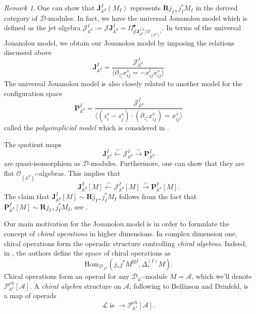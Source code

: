 \documentclass[11pt]{amsart}
\theoremstyle{definition}
\theoremstyle{remark}
\newtheorem{rem}[thm]{Remark}
\numberwithin{equation}{section}
\newcommand{\R}{\mathbf{R}}
\renewcommand{\AA}{\mathbb{A}}
\newcommand{\op}{\operatorname}
\newcommand{\cA}{\mathcal{A}}
\newcommand{\cP}{\mathcal{P}}
\begin{document}
\begin{rem}
One can show that $\mathbf{J}_{\mathbb{A}^d}^{{I}}(M_{{I}})$ represents $\R j_{I*}j^*_IM_{I}$ in the derived category
of $\mathcal{D}$-modules. In fact, we have the universal Jouanolou model \cite[4.1.3. (ii)]{BD} which
is defined as the jet algebra $\mathcal{J}_{\mathbb{A}^d}^{{I}}:=\mathscr{J}\mathbf{J}_{\mathbb{A}^d}^{{I}}
=\Omega^{\bullet}_{\mathscr{J}\mathbf{J}_{\mathbb{A}^d}^{{I},0}/\mathcal{O}_{(\mathbb{A}^d)^I}}$.
In terms of the universal Jouanolou model, we obtain our Jouanolou model by imposing the relations discussed above 
\[
\mathbf{J}_{\mathbb{A}^d}^{{I}}=\frac{\mathcal{J}_{\mathbb{A}^d}^{{I}}}{\langle \partial_{z^t_i}x^s_{ij}=-x^t_{ij}
x^s_{ij}\rangle}
\]
The universal Jouanolou model is also closely related to another model for the configuration space
\[
  \mathbf{P}_{\mathbb{A}^d}^{{I}}=\frac{\mathcal{J}_{\mathbb{A}^d}^{{I}}}{\langle (z^s_i-z^s_j)\cdot(\partial_{z^s_i}x^s_{ij})=x^s_{ij}\rangle}
  \]
  called the \textit{polysimplicial model} which is considered in \cite{FGY}.

The quotient maps
\[
\mathbf{J}_{\mathbb{A}^d}^{{I}}\xleftarrow{\sim}\mathcal{J}_{\mathbb{A}^d}^{{I}}\xrightarrow{\sim}\mathbf{P}_{\mathbb{A}^d}^{{I}}
\]
are quasi-isomorphism as $\mathcal{D}$-modules. 
Furthermore, one can show that they are flat $\mathcal{O}_{(\mathbb{A}^d)^I}$-algebras. This implies that
$$
\mathbf{J}_{\mathbb{A}^d}^{{I}}[M]\xleftarrow{\sim}\mathcal{J}_{\mathbb{A}^d}^{{I}}[M]\xrightarrow{\sim}\mathbf{P}_{\mathbb{A}^d}^{{I}}[M].
$$
The claim that  $\mathbf{J}_{\mathbb{A}^d}^{{I}}[M]\sim \R j_{I*}j^*_IM_{I}$ follows from the fact that $\mathbf{P}
_{\mathbb{A}^d}^{{I}}[M]\sim \mathbf{R}j_{I*}j^*_IM_{I}$, see \cite{FGY}.
  \end{rem}
    
  Our main motivation for the Jouanolou model is in order to formulate the concept of \textit{chiral operations} in
  higher dimensions.
  In complex dimension one, chiral operations form the operadic structure controlling \textit{chiral
  algebras}. 
  Indeed, in \cite{BD}, the authors define the space of chiral operations as
    $$
    \mathrm{Hom}_{\mathcal{D}_{X^{{I}}}}\left(j_{*}j^*M^{\boxtimes{I}},\Delta^{(I)}_*M\right).
    $$
    Chiral operations form an operad for any $\mathcal{D}_{\mathbb{A}^1}$-module $M=\cA$, which we'll denote $\mathcal{P}
    _{\AA^1}^{ch}[\cA]$.
    A \textit{chiral algebra} structure on $\cA$, following to Beilinson and Drinfeld, is a map of operads 
    \begin{equation}\label{}
      \mathcal{L}\!\op{ie} \to \cP_{\AA^1}^{ch}[\cA] . 
    \end{equation}
\end{document}
